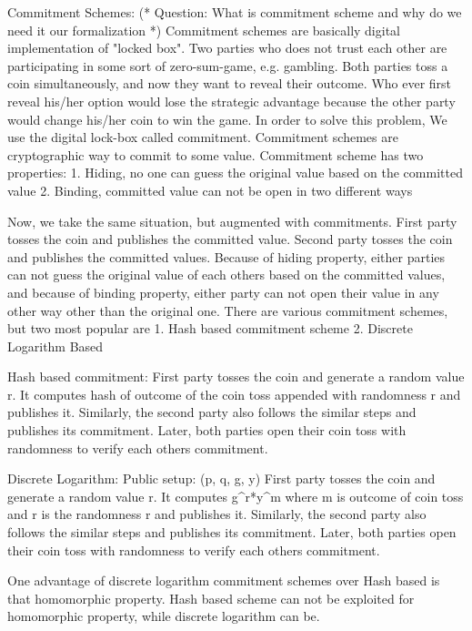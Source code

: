   Commitment Schemes: 
  (* Question: What is commitment scheme and why do we need it our formalization *)
  Commitment schemes are basically digital implementation of "locked box". Two parties who does 
  not trust each other are participating in some sort of zero-sum-game, e.g. gambling. Both parties 
  toss a coin simultaneously, and now they want to reveal their outcome.  Who ever first reveal his/her option 
  would lose the strategic advantage because the other party would change his/her coin to win the game. 
  In order to solve this problem, We use the digital lock-box called commitment.   
 Commitment schemes are cryptographic way to commit to some value. Commitment scheme 
 has two properties:
 1. Hiding, no one can guess the original value based on the committed value
 2. Binding, committed value can not be open in two different ways
 
 Now, we take the same situation, but augmented with commitments.  First party tosses the coin 
 and publishes the committed value. Second party tosses the coin 
 and  publishes the committed values.  Because of hiding property, either parties can not guess the 
 original value of each others based on the committed values, and because of binding property, 
 either party can not open their value in any other way other than the original one.  There are various 
 commitment schemes, but two most popular are 
 1. Hash based commitment scheme
 2. Discrete Logarithm Based
 
 Hash based commitment: 
 First party tosses the coin and generate a random value r. It computes hash of  outcome of the coin toss appended with randomness r
 and publishes it. Similarly, the second party also follows the similar steps and publishes its commitment. Later, both parties open 
 their coin toss with randomness to verify each others commitment. 
 
 Discrete Logarithm: 
 Public setup: (p, q, g, y) 
 First party tosses the coin and generate a random value r. It computes g^r*y^m where m is outcome of coin toss and r is the randomness r
 and publishes it. Similarly, the second party also follows the similar steps and publishes its commitment. Later, both parties open 
 their coin toss with randomness to verify each others commitment. 
  
 One advantage of discrete logarithm commitment schemes over Hash based is that homomorphic property. Hash based scheme can not be
 exploited for homomorphic property, while discrete logarithm can be. 


